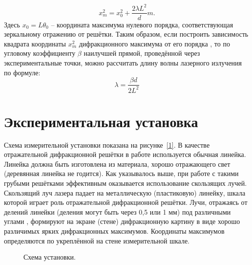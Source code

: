 \documentclass[a4paper,12pt]{article} %
\begin{document}
	\begin{equation}
		x_{m}^{2} = x_{0}^{2} + \frac{2 \lambda L^{2} }{d}m.
	\end{equation}
	Здесь $x_{0} = L \theta _{0}$ -- координата максимума нулевого порядка, соответствующая зеркальному отражению от решётки. Таким образом, если построить зависимость квадрата координаты $x_{m} ^{2}$ дифракционного максимума от его порядка , то по угловому коэффициенту $\beta$ наилучшей прямой, проведённой через экспериментальные точки, можно рассчитать длину волны лазерного излучения по формуле: 
	\begin{equation}
		\tag{**}
		\label{formula}
		\lambda = \frac{\beta d}{2 L^{2}}
	\end{equation}

\section{Экспериментальная установка}
	Схема измерительной установки показана на рисунке~\ref{1}. В качестве отражательной дифракционной решётки в работе используется обычная линейка. Линейка должна быть изготовлена из материала, хорошо отражающего свет (деревянная линейка не годится). Как	указывалось выше, при работе с такими грубыми решётками эффективным оказывается использование скользящих лучей. Скользящий луч лазера падает на металлическую
	(пластиковую) линейку, шкала которой играет роль отражательной дифракционной решётки. Лучи, отражаясь от делений линейки (деления могут быть через 0,5 или 1 мм) под различными углами , формируют на экране (стене) дифракционную картину в виде хорошо различимых	ярких дифракционных максимумов. Координаты максимумов определяются по укреплённой на стене измерительной шкале.
	
	\begin{figure}[h!]
		{\caption{Схема установки.}}{\label{fig:pic}}
	\end{figure}
\end{document}
